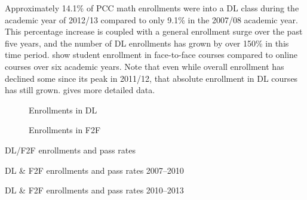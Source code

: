 Approximately 14.1\% of PCC math enrollments were into a DL class during the
academic year of 2012/13 compared to only 9.1\% in the 2007/08 academic year.
This percentage increase is coupled with a general enrollment surge over the
past five years, and the number of DL enrollments has grown by over 150\% in
this time period.  show
student enrollment in face-to-face courses compared to online courses over six
academic years. Note that even while overall enrollment has declined some since
its peak in 2011/12, that absolute enrollment in DL courses has still grown.
 gives more detailed data.

\begin{figure}[!htb]
    \begin{minipage}{.5\textwidth}
          
          \caption{Enrollments in DL}\label{fig:sec3:DLenrollments}
    \end{minipage}%
    \begin{minipage}{.5\textwidth}
          
          \caption{Enrollments in F2F}\label{fig:sec3:F2Fenrollments}
    \end{minipage}
\end{figure}

\begin{table}
  	\caption{DL/F2F enrollments and pass rates}\label{tab:sec3:F2FandDLdata}
	\centering
	\begin{minipage}{\textwidth}
          
          \vspace{2pc}
          
          \end{minipage}
\end{table}

\begin{table}
	\begin{widepage}
	\centering
  	\caption{DL \& F2F enrollments and pass rates 2007--2010}%
          
          \vspace{2pc}
  	\caption{DL \& F2F enrollments and pass rates 2010--2013}
          
          \end{widepage}
\end{table}

